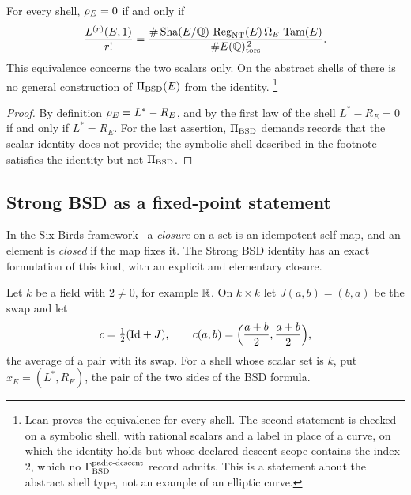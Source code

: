 \begin{theorem}\label{thm:closure:pi-bsd-iff-strong-bsd}
For every shell, $\rho_E=0$ if and only if
\[
  \frac{L^{(r)}(E,1)}{r!}
  =
  \frac{\#\operatorname{Sha}(E/\mathbb{Q})\,\operatorname{Reg}_{\mathrm{NT}}(E)\,\Omega_E\,\operatorname{Tam}(E)}
       {\#E(\mathbb{Q})_{\operatorname{tors}}^{\,2}} .
\]
This equivalence concerns the two scalars only.  On the abstract shells
of  there is no general construction of
$\Pi_{\mathrm{BSD}}(E)$ from the identity.%
\footnote{Lean proves the equivalence for every shell.  The second
statement is checked on a symbolic shell, with rational scalars and a
label in place of a curve, on which the identity holds but whose declared
descent scope contains the index $2$, which no $\Gamma_{\mathrm{BSD}}^{\mathrm{padic\text{-}descent}}$ record admits.
This is a statement about the abstract shell type, not an example of an
elliptic curve.}
\end{theorem}

\begin{proof}
By definition $\rho_E=L^*-R_E$, and by the first law of the shell
$L^*-R_E=0$ if and only if $L^*=R_E$.  For the last assertion,
$\Pi_{\mathrm{BSD}}$ demands records that the scalar identity does not provide; the
symbolic shell described in the footnote satisfies the identity but not
$\Pi_{\mathrm{BSD}}$.
\end{proof}

\subsection{Strong BSD as a fixed-point statement}
\label{sec:scalar-closure}

In the Six Birds framework~\citep{TsiokosFoundationsIII2026} a
\emph{closure} on a set is an idempotent self-map, and an element is
\emph{closed} if the map fixes it.  The Strong BSD identity has an exact
formulation of this kind, with an explicit and elementary closure.

Let $k$ be a field with $2\neq0$, for example $\mathbb{R}$.  On $k\times k$ let
$J(a,b)=(b,a)$ be the swap and let
\[
  c=\tfrac12(\mathrm{Id}+J),\qquad c(a,b)=\Bigl(\frac{a+b}{2},\frac{a+b}{2}\Bigr),
\]
the average of a pair with its swap.  For a shell whose scalar set is
$k$, put $x_E=(L^*,R_E)$, the pair of the two sides of the BSD formula.

